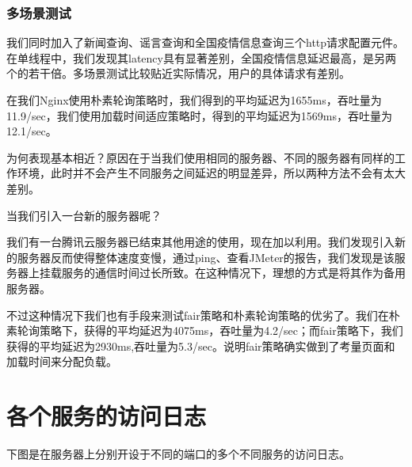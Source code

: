 \documentclass{article}
\begin{document}
\subsubsection{多场景测试}
我们同时加入了新闻查询、谣言查询和全国疫情信息查询三个http请求配置元件。在单线程中，我们发现其latency具有显著差别，全国疫情信息延迟最高，是另两个的若干倍。多场景测试比较贴近实际情况，用户的具体请求有差别。

在我们Nginx使用朴素轮询策略时，我们得到的平均延迟为1655ms，吞吐量为11.9/sec，我们使用加载时间适应策略时，得到的平均延迟为1569ms，吞吐量为12.1/sec。

为何表现基本相近？原因在于当我们使用相同的服务器、不同的服务器有同样的工作环境，此时并不会产生不同服务之间延迟的明显差异，所以两种方法不会有太大差别。

当我们引入一台新的服务器呢？

我们有一台腾讯云服务器已结束其他用途的使用，现在加以利用。我们发现引入新的服务器反而使得整体速度变慢，通过ping、查看JMeter的报告，我们发现是该服务器上挂载服务的通信时间过长所致。在这种情况下，理想的方式是将其作为备用服务器。

不过这种情况下我们也有手段来测试fair策略和朴素轮询策略的优劣了。我们在朴素轮询策略下，获得的平均延迟为4075ms，吞吐量为4.2/sec；而fair策略下，我们获得的平均延迟为2930ms,吞吐量为5.3/sec。说明fair策略确实做到了考量页面和加载时间来分配负载。

\section{各个服务的访问日志}

下图是在服务器上分别开设于不同的端口的多个不同服务的访问日志。
\end{document}
